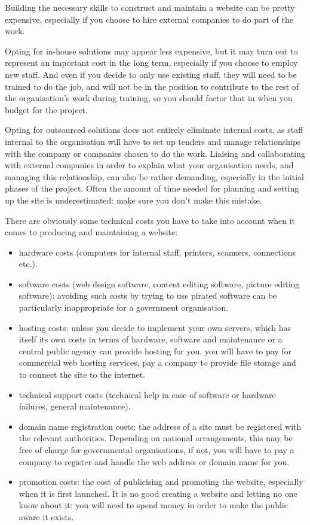 Building the necessary skills to construct and maintain a website can be pretty expensive, especially if you choose to hire external companies to do part of the work.

Opting for in-house solutions may appear less expensive, but it may turn out to represent an important cost in the long term, especially if you choose to employ new staff. And even if you decide to only use existing staff, they will need to be trained to do the job, and will not be in the position to contribute to the rest of the organisation's work during training, so you should factor that in when you budget for the project.

Opting for outsourced solutions does not entirely eliminate internal costs, as staff internal to the organisation will have to set up tenders and manage relationships with the company or companies chosen to do the work. Liaising and collaborating with external companies in order to explain what your organisation needs, and managing this relationship, can also be rather demanding, especially in the initial phases of the project. Often the amount of time needed for planning and setting up the site is underestimated: make sure you don't make this mistake.

There are obviously some technical costs you have to take into account when it comes to producing and maintaining a website:

\begin{itemize}
	\item hardware costs (computers for internal staff, printers, scanners, connections etc.).
	\item software costs (web design software, content editing software, picture editing software): avoiding such costs by trying to use pirated software can be particularly inappropriate for a government organisation.
	\item hosting costs: unless you decide to implement your own servers, which has itself its own costs in terms of hardware, software and maintenance or a central public agency can provide hosting for you, you will have to pay for commercial web hosting services, pay a company to provide file storage and to connect the site to the internet.
	\item technical support costs (technical help in case of software or hardware failures, general maintenance).
	\item domain name registration costs: the address of a site must be registered with the relevant authorities. Depending on national arrangements, this may be free of charge for governmental organisations, if not, you will have to pay a company to register and handle the web address or domain name for you.
	\item promotion costs: the cost of publicising and promoting the website, especially when it is first launched. It is no good creating a website and letting no one know about it: you will need to spend money in order to make the public aware it exists.
\end{itemize}

